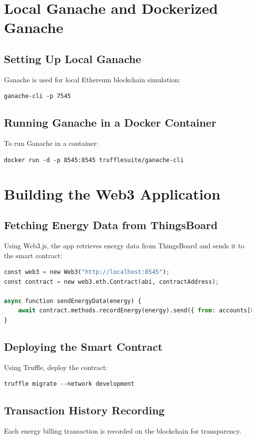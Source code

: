 \documentclass[a4paper,12pt]{report}
\begin{document}
\chapter{Local Ganache and Dockerized Ganache}
\section{Setting Up Local Ganache}
Ganache is used for local Ethereum blockchain simulation:
\begin{lstlisting}
ganache-cli -p 7545
\end{lstlisting}

\section{Running Ganache in a Docker Container}
To run Ganache in a container:
\begin{lstlisting}
docker run -d -p 8545:8545 trufflesuite/ganache-cli
\end{lstlisting}

\chapter{Building the Web3 Application}
\section{Fetching Energy Data from ThingsBoard}
Using Web3.js, the app retrieves energy data from ThingsBoard and sends it to the smart contract:
\begin{lstlisting}[language=python]
const web3 = new Web3("http://localhost:8545");
const contract = new web3.eth.Contract(abi, contractAddress);

async function sendEnergyData(energy) {
    await contract.methods.recordEnergy(energy).send({ from: accounts[0] });
}
\end{lstlisting}

\section{Deploying the Smart Contract}
Using Truffle, deploy the contract:
\begin{lstlisting}
truffle migrate --network development
\end{lstlisting}

\section{Transaction History Recording}
Each energy billing transaction is recorded on the blockchain for transparency.
\end{document}
